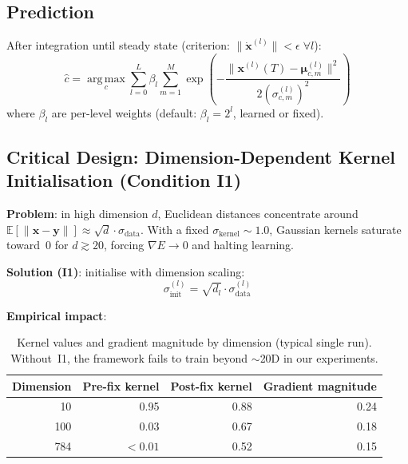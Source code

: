 \documentclass[11pt,a4paper]{article}
\begin{document}
\subsection{Prediction}

After integration until steady state (criterion: $\|\dot{\mathbf{x}}^{(l)}\| < \epsilon\;\forall l$):
\begin{equation}
  \hat{c} = \operatorname*{arg\,max}_c \sum_{l=0}^{L} \beta_l \sum_{m=1}^{M}
    \exp\!\left(-\frac{\|\mathbf{x}^{(l)}(T) - \boldsymbol{\mu}^{(l)}_{c,m}\|^2}
                      {2(\sigma^{(l)}_{c,m})^2}\right)
\label{eq:predict}
\end{equation}
where $\beta_l$ are per-level weights (default: $\beta_l = 2^l$, learned or fixed).

\subsection{Critical Design: Dimension-Dependent Kernel Initialisation (Condition I1)}
\label{sec:i1}

\textbf{Problem}: in high dimension $d$, Euclidean distances concentrate around
$\mathbb{E}[\|\mathbf{x}-\mathbf{y}\|] \approx \sqrt{d}\cdot\sigma_{\mathrm{data}}$.
With a fixed $\sigma_{\mathrm{kernel}} \sim 1.0$, Gaussian kernels saturate toward~0 for
$d \gtrsim 20$, forcing $\nabla E \to 0$ and halting learning.

\textbf{Solution (I1)}: initialise with dimension scaling:
\begin{equation}
  \sigma^{(l)}_{\mathrm{init}} = \sqrt{d_l} \cdot \sigma^{(l)}_{\mathrm{data}}
\end{equation}

\textbf{Empirical impact}:

\begin{table}[h]
\centering
\begin{tabular}{rrrr}
\toprule
\textbf{Dimension} & \textbf{Pre-fix kernel} & \textbf{Post-fix kernel} & \textbf{Gradient magnitude} \\
\midrule
10  & 0.95     & 0.88 & 0.24 \\
100 & 0.03     & 0.67 & 0.18 \\
784 & $<0.01$  & 0.52 & 0.15 \\
\bottomrule
\end{tabular}
\caption{Kernel values and gradient magnitude by dimension (typical single run).
Without~I1, the framework fails to train beyond $\sim$20D in our experiments.}
\label{tab:kernelfix}
\end{table}
\end{document}
